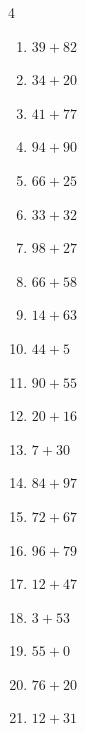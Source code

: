 \begin{multicols}{4}
\begin{enumerate}
  \item $39+82$
        \phantom{$=121$}

\columnbreak %

  \item $34+20$
        \phantom{$=54$}

  \item $41+77$
        \phantom{$=118$}

  \item $94+90$
        \phantom{$=184$}

  \item $66+25$
        \phantom{$=91$}

  \item $33+32$
        \phantom{$=65$}

  \item $98+27$
        \phantom{$=125$}

  \item $66+58$
        \phantom{$=124$}

  \item $14+63$
        \phantom{$=77$}

  \item $44+5$
        \phantom{$=49$}

  \item $90+55$
        \phantom{$=145$}

  \item $20+16$
        \phantom{$=36$}

  \item $7+30$
        \phantom{$=37$}

  \item $84+97$
        \phantom{$=181$}

  \item $72+67$
        \phantom{$=139$}

  \item $96+79$
        \phantom{$=175$}

  \item $12+47$
        \phantom{$=59$}

  \item $3+53$
        \phantom{$=56$}

  \item $55+0$
        \phantom{$=55$}

  \item $76+20$
        \phantom{$=96$}

  \item $12+31$
        \phantom{$=43$}


\end{enumerate}
\end{multicols}
